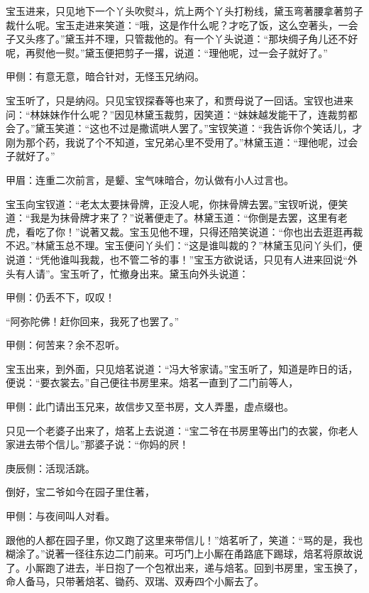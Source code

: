 \begin{parag}
    宝玉进来，只见地下一个丫头吹熨斗，炕上两个丫头打粉线，黛玉弯著腰拿著剪子裁什么呢。宝玉走进来笑道：“哦，这是作什么呢？才吃了饭，这么空著头，一会子又头疼了。”黛玉并不理，只管裁他的。有一个丫头说道：“那块绸子角儿还不好呢，再熨他一熨。”黛玉便把剪子一撂，说道：“理他呢，过一会子就好了。”\begin{note}甲侧：有意无意，暗合针对，无怪玉兄纳闷。\end{note}宝玉听了，只是纳闷。只见宝钗探春等也来了，和贾母说了一回话。宝钗也进来问：“林妹妹作什么呢？”因见林黛玉裁剪，因笑道：“妹妹越发能干了，连裁剪都会了。”黛玉笑道：“这也不过是撒谎哄人罢了。”宝钗笑道：“我告诉你个笑话儿，才刚为那个药，我说了个不知道，宝兄弟心里不受用了。”林黛玉道：“理他呢，过会子就好了。”\begin{note}甲眉：连重二次前言，是颦、宝气味暗合，勿认做有小人过言也。\end{note}宝玉向宝钗道：“老太太要抹骨牌，正没人呢，你抹骨牌去罢。”宝钗听说，便笑道：“我是为抹骨牌才来了？”说著便走了。林黛玉道：“你倒是去罢，这里有老虎，看吃了你！”说著又裁。宝玉见他不理，只得还陪笑说道：“你也出去逛逛再裁不迟。”林黛玉总不理。宝玉便问丫头们：“这是谁叫裁的？”林黛玉见问丫头们，便说道：“凭他谁叫我裁，也不管二爷的事！”宝玉方欲说话，只见有人进来回说“外头有人请”。宝玉听了，忙撤身出来。黛玉向外头说道：\begin{note}甲侧：仍丢不下，叹叹！\end{note}“阿弥陀佛！赶你回来，我死了也罢了。”\begin{note}甲侧：何苦来？余不忍听。\end{note}
\end{parag}


\begin{parag}
    宝玉出来，到外面，只见焙茗说道：“冯大爷家请。”宝玉听了，知道是昨日的话，便说：“要衣裳去。”自己便往书房里来。焙茗一直到了二门前等人，\begin{note}甲侧：此门请出玉兄来，故信步又至书房，文人弄墨，虚点缀也。\end{note}只见一个老婆子出来了，焙茗上去说道：“宝二爷在书房里等出门的衣裳，你老人家进去带个信儿。”那婆子说：“你妈的屄！\begin{note}庚辰侧：活现活跳。\end{note}倒好，宝二爷如今在园子里住著，\begin{note}甲侧：与夜间叫人对看。\end{note}跟他的人都在园子里，你又跑了这里来带信儿！”焙茗听了，笑道：“骂的是，我也糊涂了。”说著一径往东边二门前来。可巧门上小厮在甬路底下踢球，焙茗将原故说了。小厮跑了进去，半日抱了一个包袱出来，递与焙茗。回到书房里，宝玉换了，命人备马，只带著焙茗、锄药、双瑞、双寿四个小厮去了。
\end{parag}


